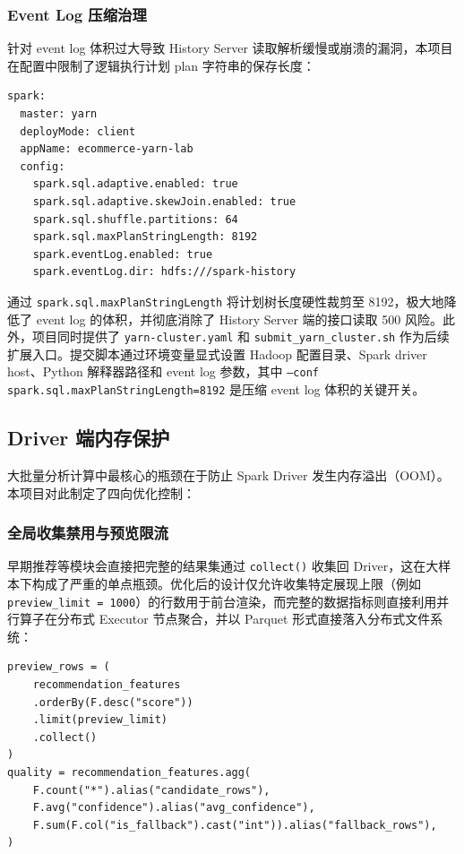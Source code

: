 \subsubsection{Event Log 压缩治理}

针对 event log 体积过大导致 History Server 读取解析缓慢或崩溃的漏洞，本项目在配置中限制了逻辑执行计划 plan 字符串的保存长度：
\begin{lstlisting}[style=codexcode]
spark:
  master: yarn
  deployMode: client
  appName: ecommerce-yarn-lab
  config:
    spark.sql.adaptive.enabled: true
    spark.sql.adaptive.skewJoin.enabled: true
    spark.sql.shuffle.partitions: 64
    spark.sql.maxPlanStringLength: 8192
    spark.eventLog.enabled: true
    spark.eventLog.dir: hdfs:///spark-history
\end{lstlisting}
通过 \texttt{spark.sql.maxPlanStringLength} 将计划树长度硬性裁剪至 8192，极大地降低了 event log 的体积，并彻底消除了 History Server 端的接口读取 500 风险。此外，项目同时提供了 \texttt{yarn-cluster.yaml} 和 \texttt{submit\_yarn\_cluster.sh} 作为后续扩展入口。提交脚本通过环境变量显式设置 Hadoop 配置目录、Spark driver host、Python 解释器路径和 event log 参数，其中 \texttt{--conf spark.sql.maxPlanStringLength=8192} 是压缩 event log 体积的关键开关。

\subsection{Driver 端内存保护}

大批量分析计算中最核心的瓶颈在于防止 Spark Driver 发生内存溢出（OOM）。本项目对此制定了四向优化控制：

\subsubsection{全局收集禁用与预览限流}

早期推荐等模块会直接把完整的结果集通过 \texttt{collect()} 收集回 Driver，这在大样本下构成了严重的单点瓶颈。优化后的设计仅允许收集特定展现上限（例如 \texttt{preview\_limit = 1000}）的行数用于前台渲染，而完整的数据指标则直接利用并行算子在分布式 Executor 节点聚合，并以 Parquet 形式直接落入分布式文件系统：
\begin{lstlisting}[style=codexcode]
preview_rows = (
    recommendation_features
    .orderBy(F.desc("score"))
    .limit(preview_limit)
    .collect()
)
quality = recommendation_features.agg(
    F.count("*").alias("candidate_rows"),
    F.avg("confidence").alias("avg_confidence"),
    F.sum(F.col("is_fallback").cast("int")).alias("fallback_rows"),
)
\end{lstlisting}

